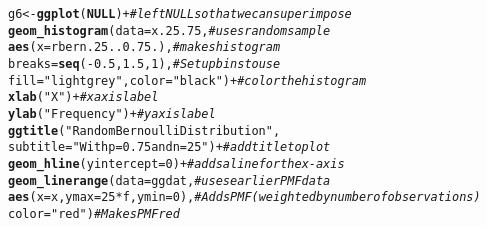 \documentclass{article}\usepackage[]{graphicx}\usepackage[]{color}
\makeatletter
\newcommand{\hlnum}[1]{\textcolor[rgb]{0.686,0.059,0.569}{#1}}%
\newcommand{\hlstr}[1]{\textcolor[rgb]{0.192,0.494,0.8}{#1}}%
\newcommand{\hlcom}[1]{\textcolor[rgb]{0.678,0.584,0.686}{\textit{#1}}}%
\newcommand{\hlopt}[1]{\textcolor[rgb]{0,0,0}{#1}}%
\newcommand{\hlstd}[1]{\textcolor[rgb]{0.345,0.345,0.345}{#1}}%
\newcommand{\hlkwa}[1]{\textcolor[rgb]{0.161,0.373,0.58}{\textbf{#1}}}%
\newcommand{\hlkwb}[1]{\textcolor[rgb]{0.69,0.353,0.396}{#1}}%
\newcommand{\hlkwc}[1]{\textcolor[rgb]{0.333,0.667,0.333}{#1}}%
\newcommand{\hlkwd}[1]{\textcolor[rgb]{0.737,0.353,0.396}{\textbf{#1}}}%
\newenvironment{kframe}{%
 \def\at@end@of@kframe{}%
 \ifinner\ifhmode%
  \def\at@end@of@kframe{\end{minipage}}%
  \begin{minipage}{\columnwidth}%
 \fi\fi%
 \def\FrameCommand##1{\hskip\@totalleftmargin \hskip-\fboxsep
 \colorbox{shadecolor}{##1}\hskip-\fboxsep
     \hskip-\linewidth \hskip-\@totalleftmargin \hskip\columnwidth}%
 \MakeFramed {\advance\hsize-\width
   \@totalleftmargin\z@ \linewidth\hsize
   \@setminipage}}%
 {\par\unskip\endMakeFramed%
 \at@end@of@kframe}
\newenvironment{knitrout}{}{} %
\makeatother
\begin{document}
\begin{enumerate}
\begin{knitrout}
\begin{kframe}
\begin{alltt}
\hlstd{g6}\hlkwb{<-}\hlkwd{ggplot}\hlstd{(}\hlkwa{NULL}\hlstd{)} \hlopt{+}                                      \hlcom{#left NULL so that we can superimpose}
  \hlkwd{geom_histogram}\hlstd{(}\hlkwc{data}\hlstd{=x.25.75,}                          \hlcom{#uses random sample}
                 \hlkwd{aes}\hlstd{(}\hlkwc{x}\hlstd{=rbern.25..0.75.),}                \hlcom{#makes histogram}
                 \hlkwc{breaks}\hlstd{=}\hlkwd{seq}\hlstd{(}\hlopt{-}\hlnum{0.5}\hlstd{,}\hlnum{1.5}\hlstd{,}\hlnum{1}\hlstd{),}                \hlcom{#Set up bins to use}
                 \hlkwc{fill} \hlstd{=} \hlstr{"lightgrey"}\hlstd{,} \hlkwc{color}\hlstd{=}\hlstr{"black"}\hlstd{)} \hlopt{+}   \hlcom{#color the histogram}
  \hlkwd{xlab}\hlstd{(}\hlstr{"X"}\hlstd{)} \hlopt{+}                                           \hlcom{#x axis label}
  \hlkwd{ylab}\hlstd{(}\hlstr{"Frequency"}\hlstd{)}\hlopt{+}                                    \hlcom{#y axis label}
  \hlkwd{ggtitle}\hlstd{(}\hlstr{"Random Bernoulli Distribution"}\hlstd{,}
          \hlkwc{subtitle} \hlstd{=} \hlstr{"With p=0.75 and n=25"}\hlstd{)} \hlopt{+}          \hlcom{#add title to plot}
  \hlkwd{geom_hline}\hlstd{(}\hlkwc{yintercept}\hlstd{=}\hlnum{0}\hlstd{)} \hlopt{+}                            \hlcom{#adds a line for the x-axis}
  \hlkwd{geom_linerange}\hlstd{(}\hlkwc{data}\hlstd{=ggdat,}                            \hlcom{#uses earlier PMF data}
                 \hlkwd{aes}\hlstd{(}\hlkwc{x}\hlstd{=x,} \hlkwc{ymax}\hlstd{=}\hlnum{25}\hlopt{*}\hlstd{f,} \hlkwc{ymin}\hlstd{=}\hlnum{0}\hlstd{),}           \hlcom{#Adds PMF (weighted by number of observations)}
                 \hlkwc{color}\hlstd{=}\hlstr{"red"}\hlstd{)}                           \hlcom{#Makes PMF red}


\end{alltt}
\end{kframe}
\end{knitrout}
\end{enumerate}
\end{document}
